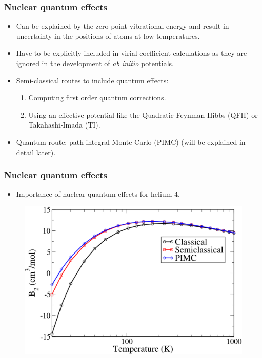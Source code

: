 \documentclass[xcolor=svgnames]{beamer}
\DeclareRobustCommand{\abinitio}[0]{\emph{ab initio}}
\begin{document}
        \begin{frame}
            \frametitle{Nuclear quantum effects}
            \begin{itemize}
                \justifying
                \item Can be explained by the zero-point vibrational energy and result in uncertainty in the positions of atoms at low temperatures.
                \item Have to be explicitly included in virial coefficient calculations as they are ignored in the development of \abinitio{} potentials.
                \item Semi-classical routes to include quantum effects:
                    \begin{enumerate}
                        \item Computing first order quantum corrections.
                        \item Using an effective potential like the Quadratic Feynman-Hibbs (QFH) or Takahashi-Imada (TI).
                    \end{enumerate}
                \item Quantum route: path integral Monte Carlo (PIMC) (will be explained in detail later).
            \end{itemize}
        \end{frame}
        \begin{frame}
            \frametitle{Nuclear quantum effects}
            \begin{itemize}
                \item Importance of nuclear quantum effects for helium-4.
            \end{itemize}
            \begin{figure}
            \centering
            \includegraphics[scale=0.17,keepaspectratio]{B2-Kate.png}
            \end{figure}
        \end{frame}
	
\end{document}
